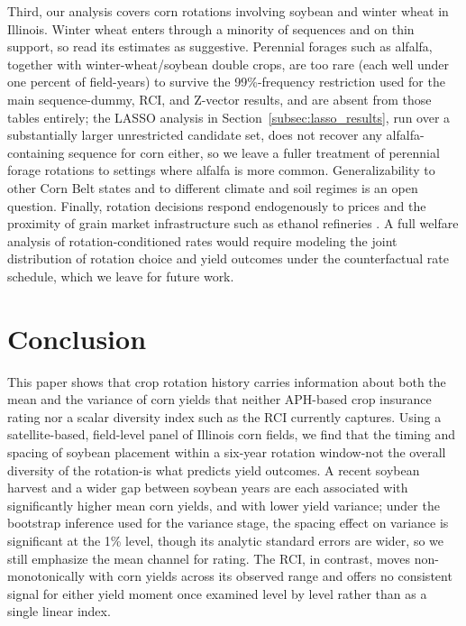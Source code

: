 \documentclass[12pt,letterpaper]{article}
\theoremstyle{remark}
\theoremstyle{remark}
\theoremstyle{plain}
\theoremstyle{definition}
\begin{document}
Third, our analysis covers corn rotations involving soybean and winter wheat in Illinois. Winter wheat enters through a minority of sequences and on thin support, so read its estimates as suggestive. Perennial forages such as alfalfa, together with winter-wheat/soybean double crops, are too rare (each well under one percent of field-years) to survive the 99\%-frequency restriction used for the main sequence-dummy, RCI, and Z-vector results, and are absent from those tables entirely; the LASSO analysis in Section~\ref{subsec:lasso_results}, run over a substantially larger unrestricted candidate set, does not recover any alfalfa-containing sequence for corn either, so we leave a fuller treatment of perennial forage rotations to settings where alfalfa is more common. Generalizability to other Corn Belt states and to different climate and soil regimes is an open question. Finally, rotation decisions respond endogenously to prices and the proximity of grain market infrastructure such as ethanol refineries \citep{Pates2025,cheu2025}. A full welfare analysis of rotation-conditioned rates would require modeling the joint distribution of rotation choice and yield outcomes under the counterfactual rate schedule, which we leave for future work.

\section{\label{sec:conclusion}Conclusion}
 
This paper shows that crop rotation history carries information about both the mean and the variance of corn yields that neither APH-based crop insurance rating nor a scalar diversity index such as the RCI currently captures. Using a satellite-based, field-level panel of Illinois corn fields, we find that the timing and spacing of soybean placement within a six-year rotation window-not the overall diversity of the rotation-is what predicts yield outcomes. A recent soybean harvest and a wider gap between soybean years are each associated with significantly higher mean corn yields, and with lower yield variance; under the bootstrap inference used for the variance stage, the spacing effect on variance is significant at the 1\% level, though its analytic standard errors are wider, so we still emphasize the mean channel for rating. The RCI, in contrast, moves non-monotonically with corn yields across its observed range and offers no consistent signal for either yield moment once examined level by level rather than as a single linear index.
\end{document}
